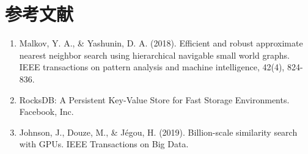 \documentclass[12pt,a4paper]{article}
\begin{document}
\section*{参考文献}
\begin{enumerate}
    \item Malkov, Y. A., \& Yashunin, D. A. (2018). Efficient and robust approximate nearest neighbor search using hierarchical navigable small world graphs. IEEE transactions on pattern analysis and machine intelligence, 42(4), 824-836.
    \item RocksDB: A Persistent Key-Value Store for Fast Storage Environments. Facebook, Inc.
    \item Johnson, J., Douze, M., \& Jégou, H. (2019). Billion-scale similarity search with GPUs. IEEE Transactions on Big Data.
\end{enumerate}
\end{document}
